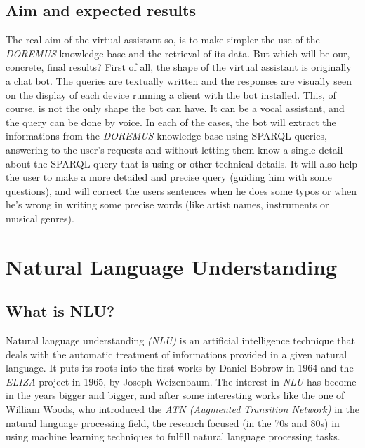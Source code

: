 \documentclass[a4paper,12pt]{report}
\begin{document}
	\section{Aim and expected results}
	The real aim of the virtual assistant so, is to make simpler the use of the \textit{DOREMUS} knowledge base and the retrieval of its data. But which will be our, concrete, final results? First of all, the shape of the virtual assistant is originally a chat bot. The queries are textually written and the responses are visually seen on the display of each device running a client with the bot installed. This, of course, is not the only shape the bot can have. It can be a vocal assistant, and the query can be done by voice. In each of the cases, the bot will extract the informations from the \textit{DOREMUS} knowledge base using SPARQL queries, answering to the user's requests and without letting them know a single detail about the SPARQL query that is using or other technical details. It will also help the user to make a more detailed and precise query (guiding him with some questions), and will correct the users sentences when he does some typos or when he's wrong in writing some precise words (like artist names, instruments or musical genres).

\chapter{Natural Language Understanding}
	\section{What is NLU?}
	Natural language understanding \textit{(NLU)} is an artificial intelligence technique that deals with the automatic treatment of informations provided in a given natural language. It puts its roots into the first works by Daniel Bobrow\cite{bobrow} in 1964 and the \textit{ELIZA}\cite{eliza} project in 1965, by Joseph Weizenbaum. The interest in \textit{NLU} has become in the years bigger and bigger, and after some interesting works like the one of William Woods\cite{woods}, who introduced the \textit{ATN (Augmented Transition Network)} in the natural language processing field, the research focused (in the 70s and 80s) in using machine learning techniques to fulfill natural language processing tasks.
\end{document}
